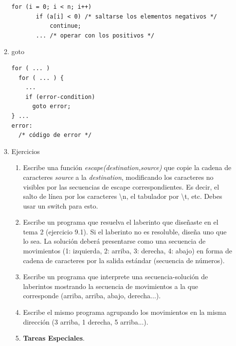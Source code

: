 \documentclass[a4paper,oneside]{article}
\begin{document}
\begin{enumerate}
\begin{enumerate}
    \begin{verbatim}
for (i = 0; i < n; i++)
       if (a[i] < 0) /* saltarse los elementos negativos */
           continue;
       ... /* operar con los positivos */
    \end{verbatim}
    
  \item goto

    \begin{verbatim}
for ( ... )
  for ( ... ) {
    ...
    if (error-condition)
      goto error;
} ...
error:
  /* código de error */
    \end{verbatim}

  \item Ejercicios
    \begin{enumerate}
      \item Escribe una función \textit{escape(destination,source)} que copie la cadena de caracteres \textit{source} a la \textit{destination}, modificando los caracteres no visibles por las secuencias de escape correspondientes. Es decir, el salto de línea por los caracteres \textbackslash{}n, el tabulador por \textbackslash{}t, etc. Debes usar un switch para esto.
      \item Escribe un programa que resuelva el laberinto que diseñaste en el tema 2 (ejercicio 9.1). Si el laberinto no es resoluble, diseña uno que lo sea. La solución deberá presentarse como una secuencia de movimientos (1: izquierda, 2: arriba, 3: derecha, 4: abajo) en forma de cadena de caracteres por la salida estándar (secuencia de números). 
      \item Escribe un programa que interprete una secuencia-solución de laberintos mostrando la secuencia de movimientos a la que corresponde (arriba, arriba, abajo, derecha...).
      \item Escribe el mismo programa agrupando los movimientos en la misma dirección (3 arriba, 1 derecha, 5 arriba...).
      \item \textbf{Tareas Especiales}.



\end{enumerate}
\end{enumerate}
\end{enumerate}
\end{document}
